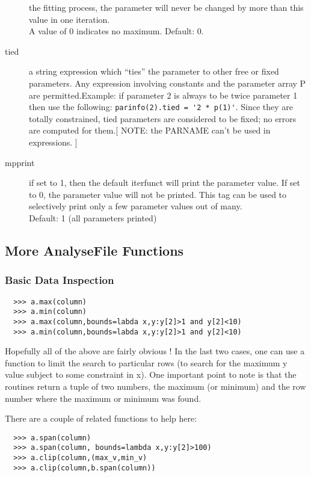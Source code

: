 \documentclass[a4paper,11pt]{scrartcl}
\begin{document}
\begin{description}
the fitting process, the parameter will never be changed by more than this value
in one iteration.\\ A value of 0 indicates no maximum.  Default: 0.
  \item[tied] a string expression which ``ties'' the parameter to other	free or
fixed parameters.  Any expression involving	constants and the parameter
array P are permitted.Example: if parameter 2 is always to be twice parameter 1
then use the following: \verb#parinfo(2).tied = '2 * p(1)'#. Since they are
totally constrained, tied parameters are considered to be fixed; no errors are
computed for them.[ NOTE: the PARNAME can't be used in expressions. ]
  \item[mpprint] if set to 1, then the default iterfunct will print the
parameter value.  If set to 0, the parameter value will not be printed.  This
tag can be used to selectively print only a few parameter values out of
many.\\Default: 1 (all parameters printed)
\end{description}

\subsection{More AnalyseFile Functions}

\subsubsection{Basic Data Inspection}
\begin{verbatim}
  >>> a.max(column)
  >>> a.min(column)
  >>> a.max(column,bounds=labda x,y:y[2]>1 and y[2]<10)
  >>> a.min(column,bounds=labda x,y:y[2]>1 and y[2]<10)
\end{verbatim}

Hopefully all of the above are fairly obvious ! In the last two cases, one can use a function to limit the search to particular rows (\eg to search for the maximum y value subject to some constraint in x). One important point to note is that the routines return a tuple of two numbers, the maximum (or minimum) and the row number where the maximum or minimum was found.

There are a couple of related functions to help here:

\begin{verbatim}
  >>> a.span(column)
  >>> a.span(column, bounds=lambda x,y:y[2]>100)
  >>> a.clip(column,(max_v,min_v)
  >>> a.clip(column,b.span(column))
\end{verbatim}
\end{document}
